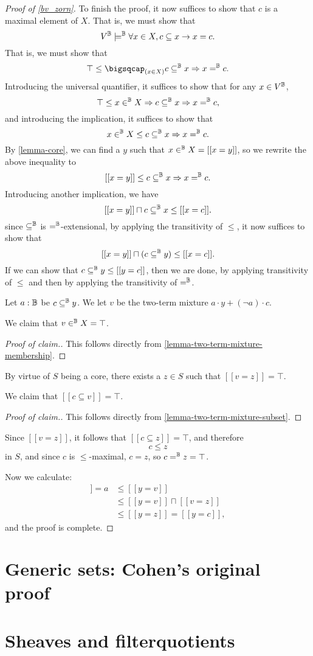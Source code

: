 \documentclass[11pt]{article}
\begin{document}
\begin{proof}[Proof of \ref{bv_zorn}]
To finish the proof, it now suffices to show that $c$ is a maximal element of $X$. That is, we must show that
$$
V^{\mathbb{B}} \models^{\mathbb{B}} \forall x \in X, c \subseteq x \to x = c.
$$
That is, we must show that
$$
\top \leq \bigsqcap_{(x \in X)} c \subseteq^\B x \Rightarrow x =^\B c.
$$
Introducing the universal quantifier, it suffices to show that for any $x \in V^{\mathbb{B}}$,
$$
\top \leq x \in^{\mathbb{B}} X \Rightarrow c \subseteq^{\mathbb{B}} x \Rightarrow x =^{\mathbb{B}} c,
$$
and introducing the implication, it suffices to show that
$$
x \in^{\mathbb{B}} X \leq c \subseteq^{\mathbb{B}} x \Rightarrow x =^{\mathbb{B}} c.
$$
By \ref{lemma-core}, we can find a $y$ such that $x \in^{\mathbb{B}} X = [[x = y]]$, so we rewrite the above inequality to
$$
[[x = y]] \leq c \subseteq^{\mathbb{B}} x \Rightarrow x =^{\mathbb{B}} c.
$$
Introducing another implication, we have
$$
[[x = y]] \sqcap c \subseteq^{\mathbb{B}} x \leq [[x = c]].
$$
since $\subseteq^{\mathbb{B}}$ is $=^{\mathbb{B}}$-extensional, by applying the transitivity of $\leq$, it now suffices to show that
$$
[[x = y]] \sqcap (c \subseteq^{\mathbb{B}} y) \leq [[x = c]].
$$
If we can show that $c \subseteq^{\mathbb{B}} y \leq [[y = c]]$, then we are done, by applying transitivity of $\leq$ and then by applying the transitivity of $=^{\mathbb{B}}$.

Let $a : \mathbb{B}$ be $c \subseteq^{\mathbb{B}} y$. We let $v$ be the two-term mixture $a \cdot y + (\neg a) \cdot c$.

We claim that $v \in^{\mathbb{B}} X = \top$.
\begin{proof}[Proof of claim.]
This follows directly from \ref{lemma-two-term-mixture-membership}.
\end{proof}

By virtue of $S$ being a core, there exists a $z \in S$ such that $[[v = z]] = \top$.

We claim that $[[c \subseteq v]] = \top$.
\begin{proof}[Proof of claim.]
This follows directly from \ref{lemma-two-term-mixture-subset}.
\end{proof}

Since $[[v = z]]$, it follows that $[[c \subseteq z]] = \top$, and therefore
$$
c \leq z
$$
in $S$, and since $c$ is $\leq$-maximal, $c = z$, so $c =^{\mathbb{B}} z = \top$.

Now we calculate:
\begin{align*}
  [[c \subseteq y]] = a &\leq [[y = v]]\\
                        &\leq [[y = v]] \sqcap [[v = z]]\\
                        &\leq [[y = z]] = [[y = c]],
\end{align*}
and the proof is complete.
\end{proof}

\section{Generic sets: Cohen's original proof}

\section{Sheaves and filterquotients}
\end{document}
